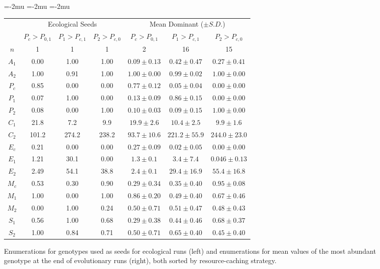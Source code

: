 \begin{figure}%

\begin{center}
\setlength\tabcolsep{1.5pt} %
\medmuskip=-2mu
\thinmuskip=-2mu
\thickmuskip=-2mu
\nulldelimiterspace=-1pt
\scriptspace=0pt
\begin{tabular}{ | c || c c c | c c c | }
  \multicolumn{1}{c}{} & \multicolumn{3}{c}{Ecological Seeds} & \multicolumn{3}{c}{Mean Dominant ($\pm S.D.$)} \\
 \cline{2-7}
  \multicolumn{1}{c|}{} & \tiny{$P_{c} > P_{0,1}$} & \tiny{$P_1 > P_{c,1}$} & \tiny{$P_2 > P_{c,0}$} & \tiny{$P_{c} > P_{0,1}$} & \tiny{$P_1 > P_{c,1}$} & \tiny{$P_2 > P_{c,0}$}  \\
 \hline
 $n$ & 1 & 1 & 1 & 2 & 16 & 15  \\
 \hhline{|=||===|===|}
 $A_1$ & 0.00 & 1.00 & 1.00 & $0.09 \pm 0.13$ & $0.42 \pm 0.47$ & $0.27 \pm 0.41$ \\
 $A_2$ & 1.00 & 0.91 & 1.00 & $1.00 \pm  0.00$ & $0.99 \pm 0.02$ & $1.00 \pm 0.00$ \\
 \hline
 $P_{c}$ & 0.85 & 0.00 & 0.00 & $0.77 \pm 0.12$ & $0.05 \pm 0.04$ & $0.00 \pm 0.00$ \\
 $P_1$ & 0.07 & 1.00 & 0.00 & $0.13 \pm 0.09$ & $0.86 \pm 0.15$ & $0.00 \pm 0.00$ \\
 $P_2$ & 0.08 & 0.00 & 1.00 & $0.10 \pm 0.03$ & $0.09 \pm 0.15$ & $1.00 \pm 0.00$ \\
 \hline
 $C_1$ & 21.8 & 7.2 & 9.9 & $19.9 \pm 2.6$ & $10.4 \pm 2.5$ & $9.9 \pm 1.6$ \\
 $C_2$ & 101.2 & 274.2 & 238.2 & $93.7 \pm 10.6$ & $221.2 \pm 55.9$ & $244.0 \pm 23.0 $ \\
 \hline
 $E_{c}$ & 0.21 & 0.00 & 0.00 & $0.27 \pm 0.09$ & $0.02 \pm 0.05$ & $0.00 \pm 0.00$ \\
 $E_1$ & 1.21 & 30.1 & 0.00 & $1.3 \pm 0.1$ & $3.4 \pm 7.4$ & $0.046 \pm 0.13$ \\
 $E_2$ & 2.49 & 54.1 & 38.8 & $2.4 \pm 0.1$ & $29.4 \pm 16.9$ & $55.4 \pm 16.8$ \\
 \hline
 $M_{c}$ & 0.53 & 0.30 & 0.90 & $0.29 \pm 0.34$ & $0.35 \pm 0.40$ & $0.95 \pm 0.08$ \\
 $M_1$ & 1.00 & 0.00 & 1.00 & $0.86 \pm 0.20$ & $0.49 \pm 0.40$ & $0.67 \pm 0.46$ \\
 $M_2$ & 0.00 & 1.00 & 0.24 & $0.50 \pm 0.71$ & $0.51 \pm 0.47$ & $0.48 \pm 0.43$ \\
 \hline
 $S_1$ & 0.56 & 1.00 & 0.68 & $0.29 \pm 0.38$ & $0.44 \pm 0.46$ & $0.68 \pm 0.37$ \\
 $S_2$ & 1.00 & 0.84 & 0.71 & $0.50 \pm 0.71$ & $0.65 \pm 0.40$ & $0.45 \pm 0.40$ \\
 \hline
\end{tabular}
\end{center}
\caption{
Enumerations for genotypes used as seeds for ecological runs (left) and enumerations for mean values of the most abundant genotype at the end of evolutionary runs (right), both sorted by resource-caching strategy.
}
\label{fig:genotypes}
\end{figure}
